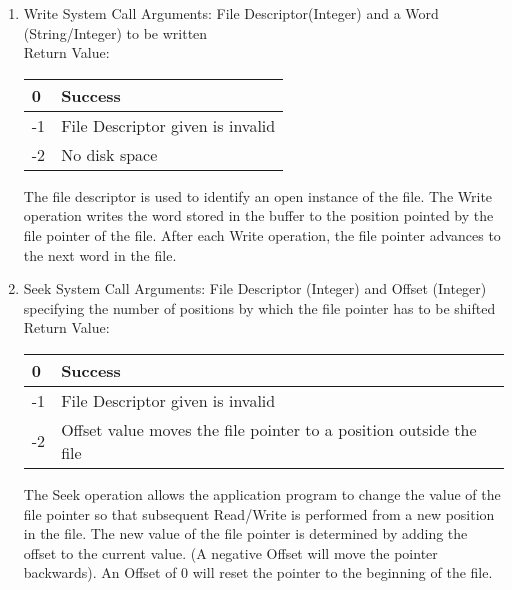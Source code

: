 \begin{enumerate}
\item{Write System Call}
Arguments: File Descriptor(Integer) and a Word (String/Integer) to be written\\
Return Value:
\FloatBarrier \begin{table}[H]
\centering
\begin{tabular}{|l|l|}
\hline
0  & Success           \\ \hline
-1 & File Descriptor given is invalid  \\ \hline
-2 & No disk space \\ \hline
\end{tabular}
\end{table} \FloatBarrier 

The file descriptor is used to identify an open instance of the file. The Write operation writes the word stored in the buffer to the position pointed by the file pointer of the file. After each Write operation, the file pointer advances to the next word in the file.

\item{Seek System Call}
Arguments: File Descriptor (Integer) and Offset (Integer) specifying the number of positions by which the file pointer has to be shifted\\
Return Value:
\FloatBarrier \begin{table}[H]
\centering
\begin{tabular}{|l|l|}
\hline
0  & Success           \\ \hline
-1 & File Descriptor given is invalid  \\ \hline
-2 & Offset value moves the file pointer to a position outside the file \\ \hline
\end{tabular}
\end{table} \FloatBarrier 

The Seek operation allows the application program to change the value of the file pointer so that subsequent Read/Write is performed from a new position in the file. The new value of the file pointer is determined by adding the offset to the current value. (A negative Offset will move the pointer backwards). An Offset of 0 will reset the pointer to the beginning of the file. 
\end{enumerate}

